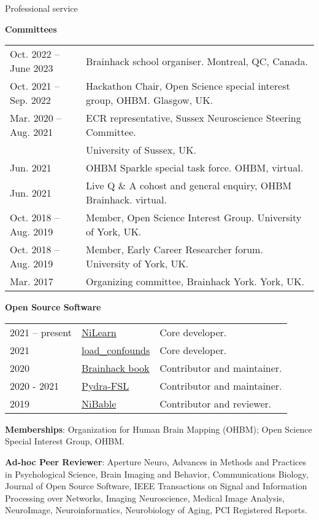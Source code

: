 \documentclass{resume} %
\begin{document}
\begin{rSection}{Professional service}

\textbf{Committees}

\begin{tabular}{@{} l l @{\hspace{6ex}}}
  Oct. 2022 -- June 2023 & Brainhack school organiser. Montreal, QC, Canada. \\
  Oct. 2021 -- Sep. 2022 & Hackathon Chair, Open Science special interest group, OHBM. Glasgow, UK. \\
  Mar. 2020 -- Aug. 2021 & ECR representative, Sussex Neuroscience Steering Committee. \\
   & University of Sussex, UK.\\
  Jun. 2021 & OHBM Sparkle special task force. OHBM, virtual. \\
  Jun. 2021 & Live Q \& A cohost and general enquiry, OHBM Brainhack. virtual. \\
  Oct. 2018 -- Aug. 2019 & Member, Open Science Interest Group. University of York, UK.\\
  Oct. 2018 -- Aug. 2019 & Member, Early Career Researcher forum. University of York, UK.\\
  Mar. 2017 & Organizing committee, Brainhack York. York, UK.\\
\end{tabular}

\textbf{Open Source Software}

\begin{tabular}{@{} l l l @{\hspace{6ex}}}
  2021 -- present & \href{https://github.com/nilearn/nilearn}{NiLearn} & Core developer.\\
  2021 & \href{https://github.com/SIMEXP/load_confounds}{load\_confounds} & Core developer.\\
  2020 & \href{https://github.com/brainhackorg/brainhack_jupyter_book}{Brainhack book} & Contributor and maintainer. \\
  2020 - 2021 & \href{https://github.com/nipype/pydra-fsl}{Pydra-FSL} & Contributor and maintainer. \\
  2019 & \href{https://github.com/nipy/nibabel/pull/793}{NiBable} & Contributor and reviewer.\\
\end{tabular}

\textbf{Memberships}: Organization for Human Brain Mapping (OHBM); Open Science Special Interest Group, OHBM.

\textbf{Ad-hoc Peer Reviewer}: Aperture Neuro,
Advances in Methods and Practices in Psychological Science,
Brain Imaging and Behavior,
Communications Biology,
Journal of Open Source Software,
IEEE Transactions on Signal and Information Processing over Networks,
Imaging Neuroscience,
Medical Image Analysis,
NeuroImage,
Neuroinformatics,
Neurobiology of Aging,
PCI Registered Reports.
\end{rSection}
\end{document}
